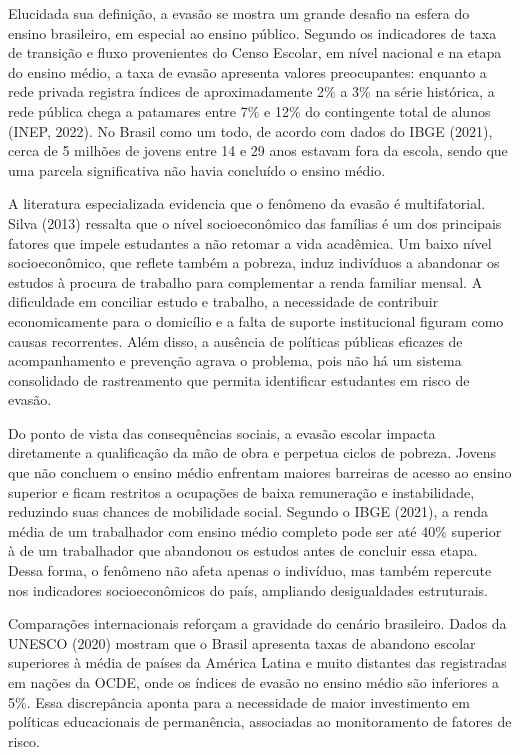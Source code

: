 \documentclass[english, spanish, brazilian]{RBIEarticle} %
\begin{document}
Elucidada sua definição, a evasão se mostra um grande desafio na esfera do ensino brasileiro, em especial ao ensino público. Segundo os indicadores de taxa de transição e fluxo provenientes do Censo Escolar, em nível nacional e na etapa do ensino médio, a taxa de evasão apresenta valores preocupantes: enquanto a rede privada registra índices de aproximadamente 2\% a 3\% na série histórica, a rede pública chega a patamares entre 7\% e 12\% do contingente total de alunos (INEP, 2022). No Brasil como um todo, de acordo com dados do IBGE (2021), cerca de 5 milhões de jovens entre 14 e 29 anos estavam fora da escola, sendo que uma parcela significativa não havia concluído o ensino médio.

A literatura especializada evidencia que o fenômeno da evasão é multifatorial. Silva (2013) ressalta que o nível socioeconômico das famílias é um dos principais fatores que impele estudantes a não retomar a vida acadêmica. Um baixo nível socioeconômico, que reflete também a pobreza, induz indivíduos a abandonar os estudos à procura de trabalho para complementar a renda familiar mensal. A dificuldade em conciliar estudo e trabalho, a necessidade de contribuir economicamente para o domicílio e a falta de suporte institucional figuram como causas recorrentes. Além disso, a ausência de políticas públicas eficazes de acompanhamento e prevenção agrava o problema, pois não há um sistema consolidado de rastreamento que permita identificar estudantes em risco de evasão.

Do ponto de vista das consequências sociais, a evasão escolar impacta diretamente a qualificação da mão de obra e perpetua ciclos de pobreza. Jovens que não concluem o ensino médio enfrentam maiores barreiras de acesso ao ensino superior e ficam restritos a ocupações de baixa remuneração e instabilidade, reduzindo suas chances de mobilidade social. Segundo o IBGE (2021), a renda média de um trabalhador com ensino médio completo pode ser até 40\% superior à de um trabalhador que abandonou os estudos antes de concluir essa etapa. Dessa forma, o fenômeno não afeta apenas o indivíduo, mas também repercute nos indicadores socioeconômicos do país, ampliando desigualdades estruturais.

Comparações internacionais reforçam a gravidade do cenário brasileiro. Dados da UNESCO (2020) mostram que o Brasil apresenta taxas de abandono escolar superiores à média de países da América Latina e muito distantes das registradas em nações da OCDE, onde os índices de evasão no ensino médio são inferiores a 5\%. Essa discrepância aponta para a necessidade de maior investimento em políticas educacionais de permanência, associadas ao monitoramento de fatores de risco.
\end{document}
